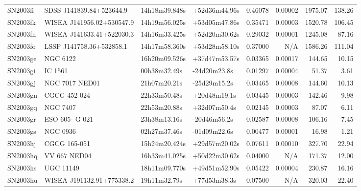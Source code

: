 \begin{longtable}{llllrrrr}
SN2003fi         &        SDSS J141839.84+523644.9 &   14h18m39.848s &   +52d36m44.96s &  0.46078 &  0.00002 &  1975.07 &      138.26 \\
SN2003fk         &       WISEA J141956.02+530547.9 &   14h19m56.025s &   +53d05m47.86s &  0.35471 &  0.00003 &  1520.78 &      106.45 \\
SN2003fn         &       WISEA J141633.41+522030.3 &   14h16m33.425s &   +52d20m30.62s &  0.29032 &  0.00001 &  1245.08 &       87.16 \\
SN2003fo         &        LSSP J141758.36+532858.1 &   14h17m58.360s &   +53d28m58.10s &  0.37000 &      N/A &  1586.26 &      111.04 \\
SN2003ge         &                        NGC 6122 &   16h20m09.526s &   +37d47m53.57s &  0.03365 &  0.00017 &   144.65 &       10.15 \\
SN2003gi         &                         IC 1561 &    00h38m32.49s &    -24d20m23.8s &  0.01297 &  0.00004 &    51.37 &        3.61 \\
SN2003gj         &                  NGC 7017 NED01 &    21h07m20.21s &    -25d29m15.2s &  0.03465 &  0.00008 &   144.60 &       10.13 \\
SN2003gn         &                    CGCG 452-024 &    22h33m50.48s &    +20d48m19.1s &  0.03445 &  0.00003 &   142.46 &        9.98 \\
SN2003gq         &                        NGC 7407 &    22h53m20.88s &    +32d07m50.4s &  0.02145 &  0.00003 &    87.07 &        6.11 \\
SN2003gr         &                  ESO 605- G 021 &    23h38m13.16s &    -20d46m56.2s &  0.02587 &  0.00008 &   106.16 &        7.45 \\
SN2003gs         &                        NGC 0936 &    02h27m37.46s &    -01d09m22.6s &  0.00477 &  0.00001 &    16.98 &        1.21 \\
SN2003hj         &                    CGCG 165-051 &   15h24m20.424s &   +29d57m20.02s &  0.07611 &  0.00010 &   327.70 &       22.94 \\
SN2003hq         &                    VV 667 NED04 &   16h33m41.025s &   +50d22m30.62s &  0.04000 &      N/A &   171.37 &       12.00 \\
SN2003hs         &                       UGC 11149 &   18h11m09.770s &   +49d51m52.90s &  0.05422 &  0.00004 &   230.87 &       16.16 \\
SN2003hu         &       WISEA J191132.91+775338.2 &    19h11m32.79s &    +77d53m38.3s &  0.07500 &      N/A &   320.03 &       22.40 \\

\end{longtable}
